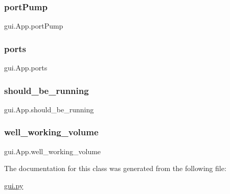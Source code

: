 \subsubsection{\texorpdfstring{portPump}{portPump}}
{\footnotesize\ttfamily gui.\+App.\+port\+Pump}

\mbox{\label{classgui_1_1_app_a03e97a8c57a5c6dc3636589851677877}} 
\subsubsection{\texorpdfstring{ports}{ports}}
{\footnotesize\ttfamily gui.\+App.\+ports}

\mbox{\label{classgui_1_1_app_a3e9aa3d2822e93efab920385513ef9e6}} 
\subsubsection{\texorpdfstring{should\_be\_running}{should\_be\_running}}
{\footnotesize\ttfamily gui.\+App.\+should\+\_\+be\+\_\+running}

\mbox{\label{classgui_1_1_app_a5a34334e0d696267cdfa62620d13f0e8}} 
\subsubsection{\texorpdfstring{well\_working\_volume}{well\_working\_volume}}
{\footnotesize\ttfamily gui.\+App.\+well\+\_\+working\+\_\+volume}



The documentation for this class was generated from the following file\+:\begin{DoxyCompactItemize}
\item 
\mbox{\hyperlink{gui_8py}{gui.\+py}}\end{DoxyCompactItemize}
